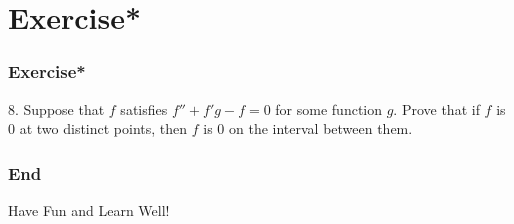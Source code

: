 \documentclass[12pt, t]{beamer}
\begin{document}
\section{Exercise*}
\begin{frame}
    \frametitle{Exercise*}
8. Suppose that $f$ satisfies $f''+f'g-f=0$ for some function $g$. Prove that if $f$ is 0 at two distinct points, 
then $f$ is 0 on the interval between them.
\end{frame}


\begin{frame}
    \frametitle{End}
    \vspace{2cm}
    \Huge \center  Have Fun and Learn Well!
\end{frame}
\end{document}
